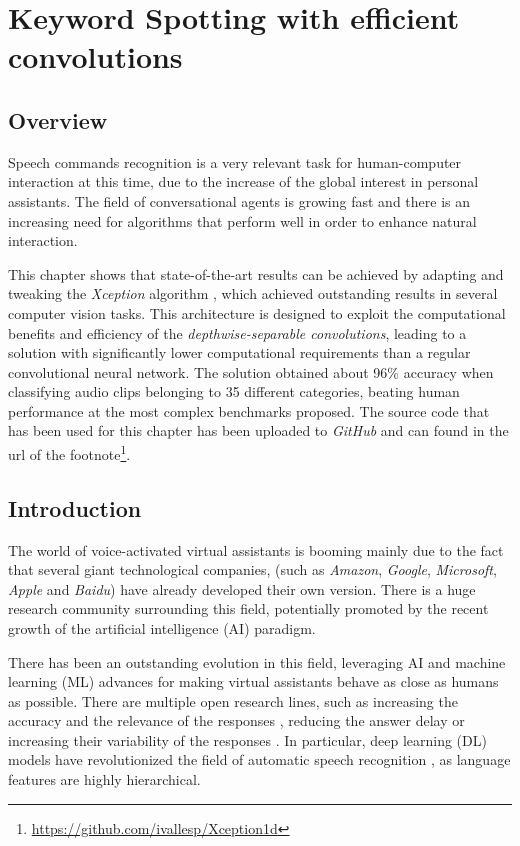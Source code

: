 
\chapter{Keyword Spotting with efficient convolutions} \label{ch:kws}

\section{Overview}
Speech commands recognition is a very relevant task for human-computer interaction at this time, due to the increase of the global interest in personal assistants. The field of conversational agents is growing fast and there is an increasing need for algorithms that perform well in order to enhance natural interaction. 

This chapter shows that state-of-the-art results can be achieved by adapting and tweaking the \textit{Xception} algorithm \autocite{chollet2017}, which achieved outstanding results in several computer vision tasks. This architecture is designed to exploit the computational benefits and efficiency of the \textit{depthwise-separable convolutions}, leading to a solution with significantly lower computational requirements than a regular convolutional neural network. The solution obtained about 96\% accuracy when classifying audio clips belonging to 35 different categories, beating human performance at the most complex benchmarks proposed.
 The source code that has been used for this chapter has been uploaded to \textit{GitHub} and can found in the url of the footnote\footnote{\url{https://github.com/ivallesp/Xception1d}}.


\section{Introduction}
The world of voice-activated virtual assistants is booming mainly due to the fact that several giant technological companies, (such as \textit{Amazon}, \textit{Google}, \textit{Microsoft}, \textit{Apple} and \textit{Baidu}) have already developed their own version. There is a huge research community surrounding this field, potentially promoted by the recent growth of the artificial intelligence (AI) paradigm.

There has been an outstanding evolution in this field, leveraging AI and machine learning (ML) advances for  making virtual assistants behave as close as humans as possible. There are multiple open research lines, such as increasing the accuracy and the relevance of the responses \autocite{milabot2017}, reducing the answer delay \autocite{Han2017} or increasing their variability of the responses \autocite{Li2017}. In particular, deep learning (DL) models have revolutionized the field of automatic speech recognition \autocite{Nassif2019}, as language features are highly hierarchical. 

